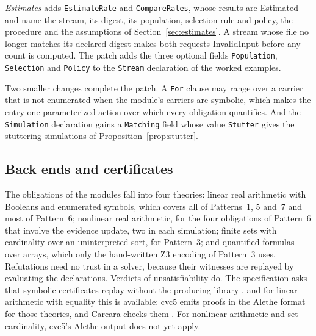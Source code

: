 \documentclass[11pt]{article}
\newcommand{\code}[1]{\texttt{#1}}
\theoremstyle{definition}
\theoremstyle{plain}
\begin{document}
\emph{Estimates} adds \code{EstimateRate} and \code{CompareRates}, whose results are Estimated and
name the stream, its digest, its population, selection rule and policy, the procedure and the
assumptions of Section~\ref{sec:estimates}. A stream whose file no longer matches its declared digest
makes both requests InvalidInput before any count is computed. The patch adds the three optional
fields \code{Population}, \code{Selection} and \code{Policy} to the \code{Stream} declaration of the
worked examples.

Two smaller changes complete the patch. A \code{For} clause may range over a carrier that is not
enumerated when the module's carriers are symbolic, which makes the entry one parameterized action
over which every obligation quantifies. And the \code{Simulation} declaration gains a
\code{Matching} field whose value \code{Stutter} gives the stuttering simulations of
Proposition~\ref{prop:stutter}.

\subsection{Back ends and certificates}\label{sec:backends}

The obligations of the modules fall into four theories: linear real arithmetic with Booleans and
enumerated symbols, which covers all of Patterns~1, 5 and~7 and most of Pattern~6; nonlinear real
arithmetic, for the four obligations of Pattern~6 that involve the evidence update, two in each
simulation; finite sets with cardinality over an uninterpreted sort, for Pattern~3; and quantified
formulas over arrays, which only the hand-written Z3 encoding of Pattern~3 uses. Refutations need no
trust in a solver, because their witnesses are replayed by evaluating the declarations. Verdicts of
unsatisfiability do. The specification asks that symbolic certificates replay without the
producing library \cite[Section~15.3]{spec}, and for linear arithmetic with equality this is
available: cvc5 emits proofs in the Alethe format for those theories, and Carcara checks them
\cite{carcara}. For nonlinear arithmetic and set cardinality, cvc5's Alethe output does not yet
apply.
\end{document}
